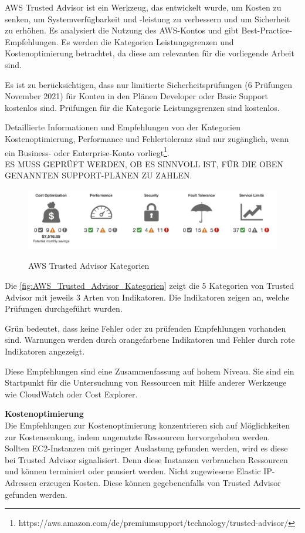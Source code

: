 AWS Trusted Advisor ist ein Werkzeug, das entwickelt wurde, um Kosten zu senken, um Systemverfügbarkeit und -leistung zu verbessern und um Sicherheit zu erhöhen. Es analysiert die Nutzung des AWS-Kontos und gibt Best-Practice-Empfehlungen.
Es werden die Kategorien Leistungsgrenzen und Kostenoptimierung betrachtet, da diese am relevanten für die vorliegende Arbeit sind.

Es ist zu berücksichtigen, dass nur limitierte Sicherheitsprüfungen (6 Prüfungen November 2021) für Konten in den Plänen Developer oder Basic Support kostenlos sind. Prüfungen für die Kategorie Leistungsgrenzen sind kostenlos.

Detaillierte Informationen und Empfehlungen von der Kategorien Kostenoptimierung, Performance und Fehlertoleranz sind nur zugänglich, wenn ein Business- oder Enterprise-Konto vorliegt\footnote{https://aws.amazon.com/de/premiumsupport/technology/trusted-advisor/}. \\
ES MUSS GEPRÜFT WERDEN, OB ES SINNVOLL IST, FÜR DIE OBEN GENANNTEN SUPPORT-PLÄNEN ZU ZAHLEN.

  \begin{figure}
      \centering
      \includegraphics[scale=0.4]{sources/AWS_Trusted_Advisor_Kategorien}
      \caption{}\label{fig:AWS_Trusted_Advisor_Kategorien} AWS Trusted Advisor Kategorien
    \end{figure}

  Die \autoref{fig:AWS_Trusted_Advisor_Kategorien} zeigt die 5 Kategorien von Trusted Advisor mit jeweils 3 Arten von Indikatoren. 
  Die Indikatoren zeigen an, welche Prüfungen durchgeführt wurden.
  
  Grün bedeutet, dass keine Fehler oder zu prüfenden Empfehlungen vorhanden sind. Warnungen werden durch orangefarbene Indikatoren und Fehler durch rote Indikatoren angezeigt.
  
  Diese Empfehlungen sind eine Zusammenfassung auf hohem Niveau. Sie sind ein Startpunkt für die Untersuchung von Ressourcen mit Hilfe anderer Werkzeuge wie CloudWatch oder Cost Explorer.

\textbf{Kostenoptimierung}\\
Die Empfehlungen zur Kostenoptimierung konzentrieren sich auf Möglichkeiten zur Kostensenkung, indem ungenutzte Ressourcen hervorgehoben werden. 
\\
Sollten EC2-Instanzen mit geringer Auslastung gefunden werden, wird es diese bei Trusted Advisor signalisiert. Denn diese Instanzen verbrauchen Ressourcen und können terminiert oder pausiert werden. 
Nicht zugewiesene Elastic IP-Adressen erzeugen Kosten. Diese können gegebenenfalls von Trusted Advisor gefunden werden. %
\\

